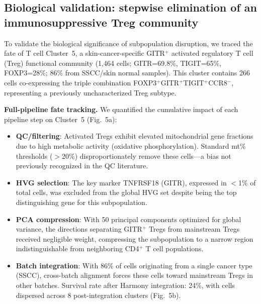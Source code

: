 

\subsection{Biological validation: stepwise elimination of an immunosuppressive Treg community}

To validate the biological significance of subpopulation disruption, we traced the fate of T cell Cluster~5, a skin-cancer-specific GITR$^+$ activated regulatory T cell (Treg) functional community (1,464 cells; GITR=69.8\%, TIGIT=65\%, FOXP3=28\%; 86\% from SSCC/skin normal samples). This cluster contains 266 cells co-expressing the triple combination FOXP3$^+$GITR$^+$TIGIT$^+$CCR8$^-$, representing a previously uncharacterized Treg subtype.

\textbf{Full-pipeline fate tracking.} We quantified the cumulative impact of each pipeline step on Cluster~5 (Fig.~5a):
\begin{itemize}
    \item \textbf{QC/filtering}: Activated Tregs exhibit elevated mitochondrial gene fractions due to high metabolic activity (oxidative phosphorylation). Standard mt\% thresholds ($>$20\%) disproportionately remove these cells---a bias not previously recognized in the QC literature.
    \item \textbf{HVG selection}: The key marker TNFRSF18 (GITR), expressed in $<$1\% of total cells, was excluded from the global HVG set despite being the top distinguishing gene for this subpopulation.
    \item \textbf{PCA compression}: With 50 principal components optimized for global variance, the directions separating GITR$^+$ Tregs from mainstream Tregs received negligible weight, compressing the subpopulation to a narrow region indistinguishable from neighboring CD4$^+$ T cell populations.
    \item \textbf{Batch integration}: With 86\% of cells originating from a single cancer type (SSCC), cross-batch alignment forces these cells toward mainstream Tregs in other batches. Survival rate after Harmony integration: 24\%, with cells dispersed across 8 post-integration clusters (Fig.~5b).
\end{itemize}

